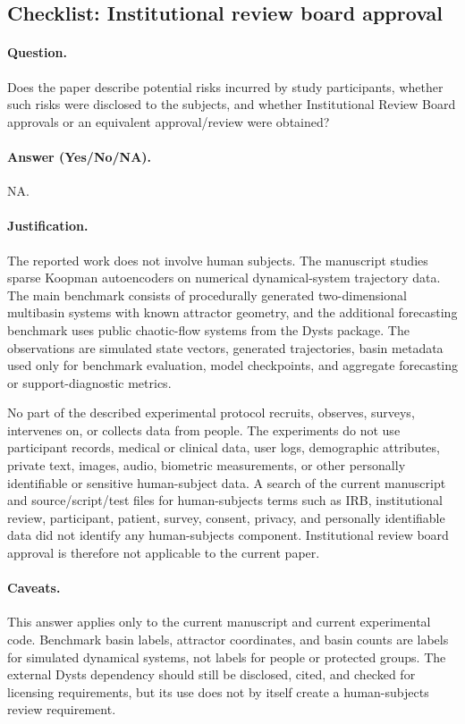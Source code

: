\subsection{Checklist: Institutional review board approval}
\label{app:checklist_irb}

\paragraph{Question.}
Does the paper describe potential risks incurred by study participants, whether
such risks were disclosed to the subjects, and whether Institutional Review
Board approvals or an equivalent approval/review were obtained?

\paragraph{Answer (Yes/No/NA).}
NA.

\paragraph{Justification.}
The reported work does not involve human subjects. The manuscript studies
sparse Koopman autoencoders on numerical dynamical-system trajectory data. The
main benchmark consists of procedurally generated two-dimensional multibasin
systems with known attractor geometry, and the additional forecasting benchmark
uses public chaotic-flow systems from the Dysts package. The observations are
simulated state vectors, generated trajectories, basin metadata used only for
benchmark evaluation, model checkpoints, and aggregate forecasting or
support-diagnostic metrics.

No part of the described experimental protocol recruits, observes, surveys,
intervenes on, or collects data from people. The experiments do not use
participant records, medical or clinical data, user logs, demographic
attributes, private text, images, audio, biometric measurements, or other
personally identifiable or sensitive human-subject data. A search of the current
manuscript and source/script/test files for human-subjects terms such as IRB,
institutional review, participant, patient, survey, consent, privacy, and
personally identifiable data did not identify any human-subjects component.
Institutional review board approval is therefore not applicable to the current
paper.

\paragraph{Caveats.}
This answer applies only to the current manuscript and current experimental
code. Benchmark basin labels, attractor coordinates, and basin counts are labels
for simulated dynamical systems, not labels for people or protected groups. The
external Dysts dependency should still be disclosed, cited, and checked for
licensing requirements, but its use does not by itself create a human-subjects
review requirement.

